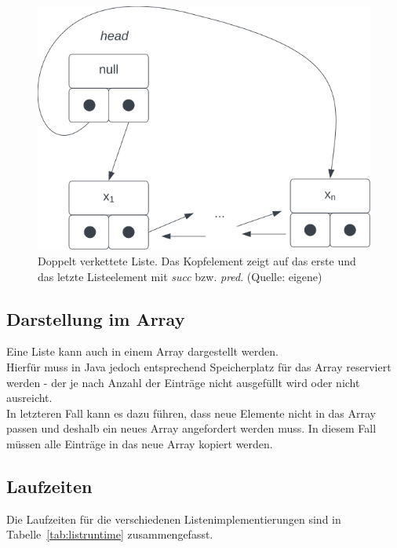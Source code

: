\begin{figure}
    \begin{center}
        \includegraphics[scale=0.4]{chapters/Datenstrukturen und Algorithmen/img/doublelinkedlist}
        \caption{Doppelt verkettete Liste. Das Kopfelement zeigt auf das erste und das letzte Listeelement mit \textit{succ} bzw. \textit{pred}. (Quelle: eigene)}
        \label{fig:doublelinkedlist}
    \end{center}
\end{figure}

\subsection{Darstellung im Array}
Eine Liste kann auch in einem Array dargestellt werden.\\
Hierfür muss in Java jedoch entsprechend Speicherplatz für das Array reserviert werden - der je nach Anzahl der Einträge nicht ausgefüllt wird oder nicht ausreicht.\\
In letzteren Fall kann es dazu führen, dass neue Elemente nicht in das Array passen und deshalb ein neues Array angefordert werden muss.
In diesem Fall müssen alle Einträge in das neue Array kopiert werden.


\subsection{Laufzeiten}

Die Laufzeiten für die verschiedenen Listenimplementierungen sind in Tabelle~\ref{tab:listruntime} zusammengefasst.\\

